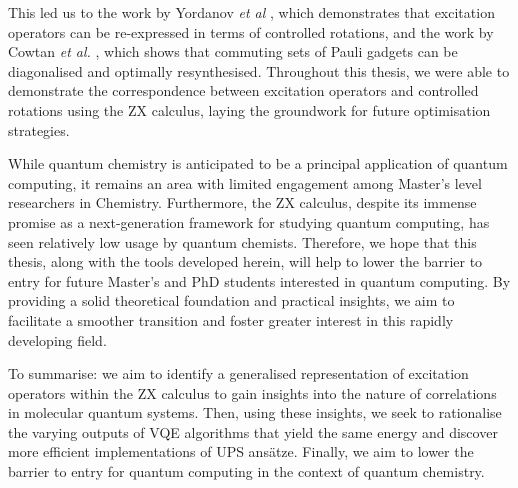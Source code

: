 This led us to the work by Yordanov \textit{et al} \cite{Yordanov2020}, which demonstrates that excitation operators can be re-expressed in terms of controlled rotations, and the work by Cowtan \textit{et al.} \cite{Cowtan2020}, which shows that commuting sets of Pauli gadgets can be diagonalised and optimally resynthesised. Throughout this thesis, we were able to demonstrate the correspondence between excitation operators and controlled rotations using the ZX calculus, laying the groundwork for future optimisation strategies.

While quantum chemistry is anticipated to be a principal application of quantum computing, it remains an area with limited engagement among Master's level researchers in Chemistry. Furthermore, the ZX calculus, despite its immense promise as a next-generation framework for studying quantum computing, has seen relatively low usage by quantum chemists. Therefore, we hope that this thesis, along with the tools developed herein, will help to lower the barrier to entry for future Master's and PhD students interested in quantum computing. By providing a solid theoretical foundation and practical insights, we aim to facilitate a smoother transition and foster greater interest in this rapidly developing field.

To summarise: we aim to identify a generalised representation of excitation operators within the ZX calculus to gain insights into the nature of correlations in molecular quantum systems. Then, using these insights, we seek to rationalise the varying outputs of VQE algorithms that yield the same energy and discover more efficient implementations of UPS ansätze. Finally, we aim to lower the barrier to entry for quantum computing in the context of quantum chemistry.
